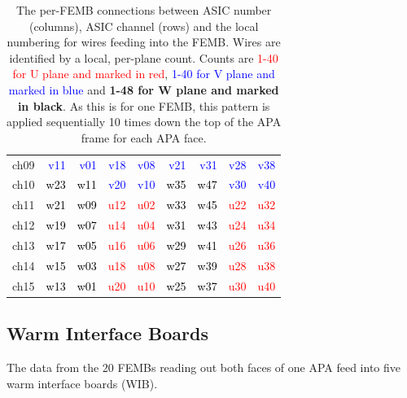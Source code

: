 \documentclass[pdftex,12pt,letter]{article}
\begin{document}
\begin{table}[htp]
\begin{tabular}{r|rrrrrrrr}
ch09 & \textcolor{blue}{v11} & \textcolor{blue}{v01} & \textcolor{blue}{v18} & \textcolor{blue}{v08} & \textcolor{blue}{v21} & \textcolor{blue}{v31} & \textcolor{blue}{v28} & \textcolor{blue}{v38}\\
ch10 & \textcolor{black}{w23} & \textcolor{black}{w11} & \textcolor{blue}{v20} & \textcolor{blue}{v10} & \textcolor{black}{w35} & \textcolor{black}{w47} & \textcolor{blue}{v30} & \textcolor{blue}{v40}\\
ch11 & \textcolor{black}{w21} & \textcolor{black}{w09} & \textcolor{red}{u12} & \textcolor{red}{u02} & \textcolor{black}{w33} & \textcolor{black}{w45} & \textcolor{red}{u22} & \textcolor{red}{u32}\\
ch12 & \textcolor{black}{w19} & \textcolor{black}{w07} & \textcolor{red}{u14} & \textcolor{red}{u04} & \textcolor{black}{w31} & \textcolor{black}{w43} & \textcolor{red}{u24} & \textcolor{red}{u34}\\
ch13 & \textcolor{black}{w17} & \textcolor{black}{w05} & \textcolor{red}{u16} & \textcolor{red}{u06} & \textcolor{black}{w29} & \textcolor{black}{w41} & \textcolor{red}{u26} & \textcolor{red}{u36}\\
ch14 & \textcolor{black}{w15} & \textcolor{black}{w03} & \textcolor{red}{u18} & \textcolor{red}{u08} & \textcolor{black}{w27} & \textcolor{black}{w39} & \textcolor{red}{u28} & \textcolor{red}{u38}\\
ch15 & \textcolor{black}{w13} & \textcolor{black}{w01} & \textcolor{red}{u20} & \textcolor{red}{u10} & \textcolor{black}{w25} & \textcolor{black}{w37} & \textcolor{red}{u30} & \textcolor{red}{u40}\\
\hline
\end{tabular}


  \caption{The per-FEMB connections between ASIC number (columns), ASIC channel (rows) and the local numbering for wires feeding into the FEMB.  Wires are identified by a local, per-plane count.  Counts are \textcolor{red}{1-40 for U plane and marked in red}, \textcolor{blue}{1-40 for V plane and marked in blue} and \textbf{1-48 for W plane and marked in black}.  As this is for one FEMB, this pattern is applied sequentially 10 times down the top of the APA frame for each APA face.}
\end{table}

\subsection{Warm Interface Boards}

The data from the 20 FEMBs reading out both faces of one APA feed into
five warm interface boards (WIB).
\end{document}
